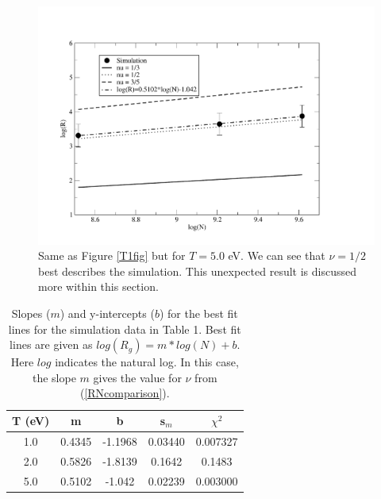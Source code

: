 \documentclass{article}
\begin{document}
\begin{multicols}{2}
\begin{figure}[H]
\begin{center}
\includegraphics[width=\linewidth]{Figures/T5plot.pdf}
\caption{Same as Figure \ref{T1fig} but for $T=5.0$ eV.  We can see that $\nu = 1/2$ best describes the simulation.  This unexpected result is discussed more within this section.}
\label{T5fig}
\end{center}
\end{figure}

\begin{table}
\begin{center}
\begin{tabular}{| c | c | c | c | c |}
\hline \textbf{T (eV)} & \textbf{m} & \textbf{b} & \textbf{s$_m$} & \textbf{$\chi ^2$} \\ \hline
1.0 & 0.4345 & -1.1968 & 0.03440 & 0.007327 \\ \hline
2.0 & 0.5826 & -1.8139 & 0.1642 & 0.1483 \\ \hline
5.0 & 0.5102 & -1.042 & 0.02239 & 0.003000 \\ \hline
\end{tabular}
\caption{Slopes ($m$) and y-intercepts ($b$) for the best fit lines for the simulation data in Table 1.  Best fit lines are given as $log(R_g) = m*log(N) + b$.  Here $log$ indicates the natural log.  In this case, the slope $m$ gives the value for $\nu$ from (\ref{RNcomparison}).}
\end{center}
\end{table}


\end{multicols}
\end{document}
